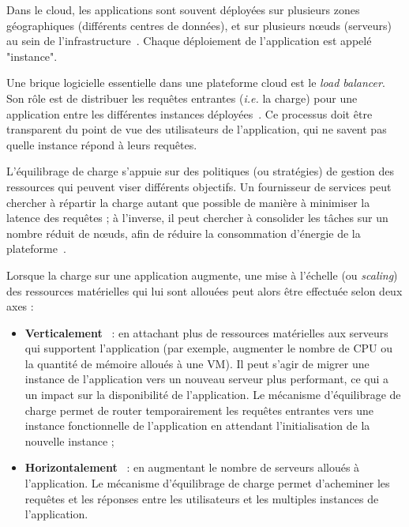 Dans le cloud, les applications sont souvent déployées sur plusieurs zones géographiques (différents centres de données), et sur plusieurs nœuds (serveurs) au sein de l'infrastructure~\cite{hayesCloudComputing2008}. Chaque déploiement de l'application est appelé "instance".

Une brique logicielle essentielle dans une plateforme cloud est le \textit{load balancer}. Son rôle est de distribuer les requêtes entrantes (\textit{i.e.} la charge) pour une application entre les différentes instances déployées~\cite{jafarnejadghomiLoadbalancingAlgorithmsCloud2017}. Ce processus doit être transparent du point de vue des utilisateurs de l'application, qui ne savent pas quelle instance répond à leurs requêtes.

L'équilibrage de charge s'appuie sur des politiques (ou stratégies) de gestion des ressources qui peuvent viser différents objectifs. Un fournisseur de services peut chercher à répartir la charge autant que possible de manière à minimiser la latence des requêtes ; à l'inverse, il peut chercher à consolider les tâches sur un nombre réduit de nœuds, afin de réduire la consommation d'énergie de la plateforme~\cite{leeEnergyEfficientUtilization2012}.

Lorsque la charge sur une application augmente, une mise à l'échelle (ou \textit{scaling}) des ressources matérielles qui lui sont allouées peut alors être effectuée selon deux axes :

\begin{itemize}
    \item \textbf{Verticalement}~\cite{boyd-wickizerAnalysisLinuxScalability, linderOracleParallelRDBMS1993, xian-hesunScalabilityParallelAlgorithmmachine1994} : en attachant plus de ressources matérielles aux serveurs qui supportent l'application (par exemple, augmenter le nombre de \gls{CPU} ou la quantité de mémoire alloués à une \gls{VM}). Il peut s'agir de migrer une instance de l'application vers un nouveau serveur plus performant, ce qui a un impact sur la disponibilité de l'application. Le mécanisme d'équilibrage de charge permet de router temporairement les requêtes entrantes vers une instance fonctionnelle de l'application en attendant l'initialisation de la nouvelle instance ;
    \item \textbf{Horizontalement}~\cite{al-faresHederaDynamicFlow, lakshmanCassandraDecentralizedStructured2010, weilCephScalableHighPerformance} : en augmentant le nombre de serveurs alloués à l'application. Le mécanisme d'équilibrage de charge permet d'acheminer les requêtes et les réponses entre les utilisateurs et les multiples instances de l'application.
\end{itemize}

